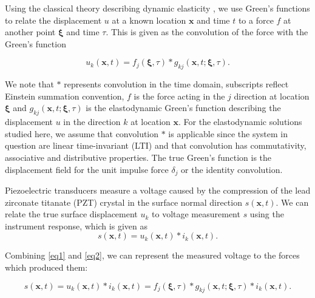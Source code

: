 \documentclass[preprint,3p, 11pt,authoryear]{elsarticle}
\begin{document}
Using the classical theory describing dynamic elasticity \citep{Aki2002}, we use Green's functions to relate the displacement $u$ at a known location $\mathbf{x}$ and time $t$ to a force $f$ at another point $\mathbf{\xi}$ and time $\tau$. This is given as the convolution of the force with the Green's function

\begin{equation}
\label{eq1}
           u_{k}\left( \mathbf{x}, t \right)  =  
            f_{j}\left( \mathbf{\xi}, \tau \right) \ast 
            g_{kj}\left( \mathbf{x}, t;\mathbf{\xi}, \tau \right).
\end{equation}

\noindent We note that $\ast$ represents convolution in the time domain, subscripts reflect Einstein summation convention, $f$ is the force acting in the $j$ direction at location $\mathbf{\xi}$ and $g_{kj}\left( \mathbf{x}, t;\mathbf{\xi}, \tau \right)$ is the elastodynamic Green's function describing the displacement $u$ in the direction $k$ at location $\mathbf{x}$. For the elastodynamic solutions studied here, we assume that convolution $\ast$ is applicable since the system in question are linear time-invariant (LTI) and that convolution has commutativity, associative and distributive properties. The true Green's function is the displacement field for the unit impulse force $\delta_{j}$ or the identity convolution. 

Piezoelectric transducers measure a voltage caused by the compression of the lead zirconate titanate (PZT) crystal in the surface normal direction $s\left( \mathbf{x}, t \right)$. We can relate the true surface displacement $u_{k}$ to voltage measurement $s$ using the instrument response, which is given as
   \begin{equation}
    \label{eq2}
        s\left( \mathbf{x}, t \right) =
            u_{k}\left( \mathbf{x}, t \right) \ast i_{k}\left(\mathbf{x},t \right).
    \end{equation}
    
    \noindent Combining \eqref{eq1} and \eqref{eq2}, we can represent the measured voltage to the forces which produced them:

    \begin{equation}
    \label{eq3}
        s\left( \mathbf{x}, t \right) =
            u_{k}\left( \mathbf{x}, t \right) \ast i_{k}\left(\mathbf{x}, t \right) =  
                f_{j}\left( \mathbf{\xi}, \tau \right) \ast 
                g_{kj}\left( \mathbf{x}, t;\mathbf{\xi}, \tau \right) \ast i_{k}\left(\mathbf{x},  t \right).
    \end{equation}
\end{document}
